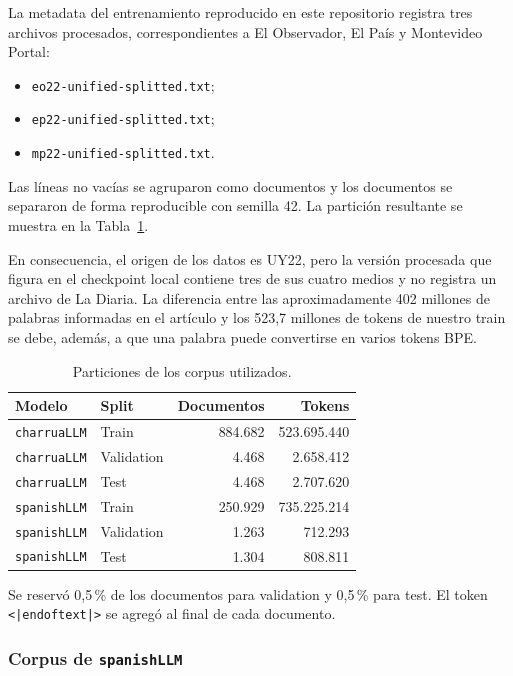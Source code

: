 \documentclass[11pt,a4paper]{article}
\newcommand{\charrua}{\texttt{charruaLLM}}
\newcommand{\spanishmodel}{\texttt{spanishLLM}}
\newcommand{\code}[1]{\texttt{#1}}
\begin{document}
La metadata del entrenamiento reproducido en este repositorio registra tres
archivos procesados, correspondientes a El Observador, El País y Montevideo
Portal:

\begin{itemize}
    \item \code{eo22-unified-splitted.txt};
    \item \code{ep22-unified-splitted.txt};
    \item \code{mp22-unified-splitted.txt}.
\end{itemize}

Las líneas no vacías se agruparon como documentos y los documentos se
separaron de forma reproducible con semilla 42. La partición resultante se
muestra en la Tabla~\ref{tab:datos}.

En consecuencia, el origen de los datos es UY22, pero la versión procesada que
figura en el checkpoint local contiene tres de sus cuatro medios y no registra
un archivo de La Diaria. La diferencia entre las aproximadamente 402 millones
de palabras informadas en el artículo y los 523,7 millones de tokens de nuestro
train se debe, además, a que una palabra puede convertirse en varios tokens BPE.

\begin{table}[H]
    \centering
    \caption{Particiones de los corpus utilizados.}
    \label{tab:datos}
    \begin{tabular}{llrr}
        \toprule
        Modelo & Split & Documentos & Tokens \\
        \midrule
        \charrua & Train & 884.682 & 523.695.440 \\
        \charrua & Validation & 4.468 & 2.658.412 \\
        \charrua & Test & 4.468 & 2.707.620 \\
        \midrule
        \spanishmodel & Train & 250.929 & 735.225.214 \\
        \spanishmodel & Validation & 1.263 & 712.293 \\
        \spanishmodel & Test & 1.304 & 808.811 \\
        \bottomrule
    \end{tabular}
\end{table}

Se reservó 0,5\,\% de los documentos para validation y 0,5\,\% para test. El
token \texttt{<|endoftext|>} se agregó al final de cada documento.

\subsubsection{Corpus de \spanishmodel}
\end{document}
